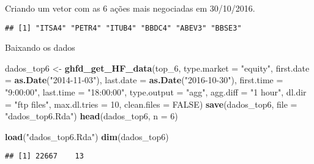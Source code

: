 \documentclass[]{article}
\newenvironment{Shaded}{\begin{snugshade}}{\end{snugshade}}
\newcommand{\KeywordTok}[1]{\textcolor[rgb]{0.13,0.29,0.53}{\textbf{{#1}}}}
\newcommand{\DataTypeTok}[1]{\textcolor[rgb]{0.13,0.29,0.53}{{#1}}}
\newcommand{\DecValTok}[1]{\textcolor[rgb]{0.00,0.00,0.81}{{#1}}}
\newcommand{\StringTok}[1]{\textcolor[rgb]{0.31,0.60,0.02}{{#1}}}
\newcommand{\OtherTok}[1]{\textcolor[rgb]{0.56,0.35,0.01}{{#1}}}
\newcommand{\NormalTok}[1]{{#1}}
\begin{document}
Criando um vetor com as 6 ações mais negociadas em 30/10/2016.

\begin{Shaded}
\end{Shaded}

\begin{verbatim}
## [1] "ITSA4" "PETR4" "ITUB4" "BBDC4" "ABEV3" "BBSE3"
\end{verbatim}

Baixando os dados

\begin{Shaded}
\begin{Highlighting}[]
\NormalTok{dados_top6 <-}\StringTok{ }\KeywordTok{ghfd_get_HF_data}\NormalTok{(top_6, }\DataTypeTok{type.market =} \StringTok{"equity"}\NormalTok{, }\DataTypeTok{first.date =} \KeywordTok{as.Date}\NormalTok{(}\StringTok{"2014-11-03"}\NormalTok{), }
    \DataTypeTok{last.date =} \KeywordTok{as.Date}\NormalTok{(}\StringTok{"2016-10-30"}\NormalTok{), }\DataTypeTok{first.time =} \StringTok{"9:00:00"}\NormalTok{, }\DataTypeTok{last.time =} \StringTok{"18:00:00"}\NormalTok{, }
    \DataTypeTok{type.output =} \StringTok{"agg"}\NormalTok{, }\DataTypeTok{agg.diff =} \StringTok{"1 hour"}\NormalTok{, }\DataTypeTok{dl.dir =} \StringTok{"ftp files"}\NormalTok{, }\DataTypeTok{max.dl.tries =} \DecValTok{10}\NormalTok{, }
    \DataTypeTok{clean.files =} \OtherTok{FALSE}\NormalTok{)}
\KeywordTok{save}\NormalTok{(dados_top6, }\DataTypeTok{file =} \StringTok{"dados_top6.Rda"}\NormalTok{)}
\KeywordTok{head}\NormalTok{(dados_top6, }\DataTypeTok{n =} \DecValTok{6}\NormalTok{)}
\end{Highlighting}
\end{Shaded}

\begin{Shaded}
\begin{Highlighting}[]
\KeywordTok{load}\NormalTok{(}\StringTok{"dados_top6.Rda"}\NormalTok{)}
\KeywordTok{dim}\NormalTok{(dados_top6)}
\end{Highlighting}
\end{Shaded}

\begin{verbatim}
## [1] 22667    13
\end{verbatim}
\end{document}
